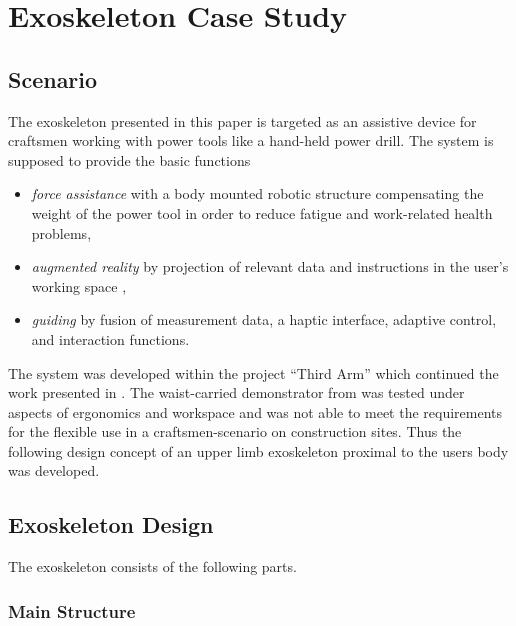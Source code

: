 \documentclass[twocolumn,10pt]{IFTOMM}
\begin{document}
\section{Exoskeleton Case Study}
\label{sec:exo_scenario}
\subsection{Scenario}

The exoskeleton presented in this paper is targeted as an assistive device for craftsmen working with power tools like a hand-held power drill.
The system is supposed to provide the basic functions
%
\begin{itemize}
    \item \emph{force assistance} with a body mounted robotic structure compensating the weight of the power tool in order to reduce fatigue and work-related health problems,
    \item \emph{augmented reality} by projection of relevant data and instructions in the user's working space \cite{NuelleBriTapDem2018},
    \item \emph{guiding} by fusion of measurement data, a haptic interface, adaptive control, and interaction functions.
\end{itemize}
%
%
%
The system was developed within the project ``Third Arm'' \cite{NuelleSchTapLil2017} which continued the work presented in \cite{PetereitAlbJerSch2012}. 
The waist-carried demonstrator from \cite{PetereitAlbJerSch2012} was tested under aspects of ergonomics and workspace and was not able to meet the requirements for the flexible use in a  craftsmen-scenario on construction sites. Thus the following design concept of an upper limb exoskeleton proximal to the users body was developed.

\subsection{Exoskeleton Design}
\label{sec:exo_des}
The exoskeleton consists of the following parts.

\subsubsection{Main Structure}
\label{sec:exo_des_main}
\end{document}
